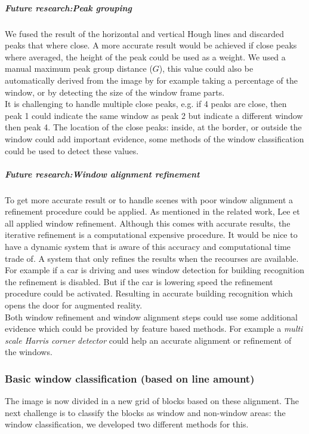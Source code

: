 \subparagraph{Future research:Peak grouping}
We fused the result of the horizontal and vertical Hough lines and discarded
peaks that where close.  A more accurate result would be achieved if close peaks
where averaged, the height of the peak could be used as a weight.  We used a
manual maximum peak group distance ($G$), this value could also be automatically
derived from the image by for example taking a percentage of the window, or by
detecting the size of the window frame parts.\\ It is challenging to handle
multiple close peaks, e.g. if 4 peaks are close, then peak 1 could indicate the
same window as peak 2 but indicate a different window then peak 4. The location
of the close peaks: inside, at the border, or outside the window could add
important evidence, some methods of the window classification could be used to
detect these values.

\subparagraph{Future research:Window alignment refinement}
To get more accurate result or to handle scenes with poor window alignment a
refinement procedure could be applied.  As mentioned in the related work, Lee et
all \cite{Lee_extraction} applied window refinement.  Although this comes with
accurate results, the iterative refinement is a computational expensive
procedure.  It would be nice to have a dynamic system that is aware of this
accuracy and computational time trade of. A system that only refines the results
when the recourses are available.  For example if a car is driving and uses
window detection for building recognition the refinement is disabled.  But if
the car is lowering speed the refinement procedure could be activated.
Resulting in accurate building recognition which opens the door for augmented
reality.\\

Both window refinement and window alignment steps could use some additional
evidence which could be provided by feature based methods.  For example a
\emph{multi scale Harris corner detector} could help an accurate alignment or
refinement of the windows.








\subsubsection{Basic window classification (based on line amount)}
The image is now divided in a new grid of blocks based on these
alignment. The next challenge is to classify the blocks as window and
non-window areas: the window classification, we developed two different methods for this.

